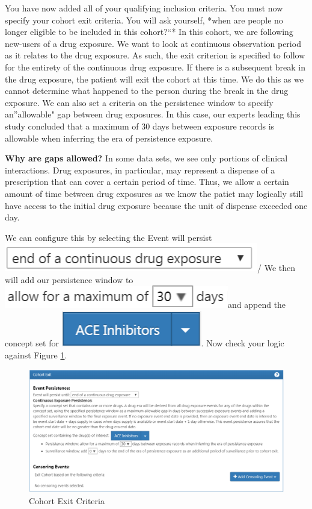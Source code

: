 \documentclass[11pt]{book}
\theoremstyle{definition}
\theoremstyle{definition}
\theoremstyle{definition}
\theoremstyle{remark}
\begin{document}
You have now added all of your qualifying inclusion criteria. You must now specify your cohort exit criteria. You will ask yourself, *when are people no longer eligible to be included in this cohort?``* In this cohort, we are following new-users of a drug exposure. We want to look at continuous observation period as it relates to the drug exposure. As such, the exit criterion is specified to follow for the entirety of the continuous drug exposure. If there is a subsequent break in the drug exposure, the patient will exit the cohort at this time. We do this as we cannot determine what happened to the person during the break in the drug exposure. We can also set a criteria on the persistence window to specify an''allowable" gap between drug exposures. In this case, our experts leading this study concluded that a maximum of 30 days between exposure records is allowable when inferring the era of persistence exposure.

\textbf{Why are gaps allowed?} In some data sets, we see only portions of clinical interactions. Drug exposures, in particular, may represent a dispense of a prescription that can cover a certain period of time. Thus, we allow a certain amount of time between drug exposures as we know the patiet may logically still have access to the initial drug exposure because the unit of dispense exceeded one day.

We can configure this by selecting the Event will persist \includegraphics{images/Cohorts/endofDE.png}/ We then will add our persistence window to \includegraphics{images/Cohorts/PEwindow.png}and append the concept set for \includegraphics{images/Cohorts/concept-added.png}. Now check your logic against Figure \ref{fig:ATLAScohortexit}.

\begin{figure}

{\centering \includegraphics[width=0.8\linewidth]{images/Cohorts/cohort-exit} 

}

\caption{Cohort Exit Criteria}\label{fig:ATLAScohortexit}
\end{figure}
\end{document}
